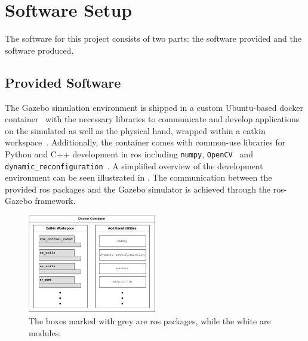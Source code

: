 \section{Software Setup}\label{sec:system-setup-software-setup}

The software for this project consists of two parts: the software provided and the software produced.

\subsection{Provided Software}\label{sec:system-setup-simulation-setup-provided}

The Gazebo simulation environment is shipped in a custom Ubuntu-based docker container~\cite{docker, ubuntu-docker-image} with the necessary libraries to communicate and develop applications on the simulated as well as the physical hand, wrapped within a catkin workspace~\cite{catkin}. Additionally, the container comes with common-use libraries for Python and C++ development in \gls{ros} including \texttt{numpy}\cite{numpy}, \texttt{OpenCV}~\cite{opencv} and \texttt{dynamic\_reconfiguration}~\cite{dynamic-reconfiguration}. A simplified overview of the development environment can be seen illustrated in . The communication between the provided \gls{ros} packages and the Gazebo simulator is achieved through the \gls{ros}-Gazebo framework. 

\begin{figure}[!h]
	\begin{small}
		\begin{center}
			\includegraphics[width=0.5\textwidth]{chapters/system-setup/fig/init-package-diagram.pdf}
		\end{center}
		\caption{The boxes marked with grey are \gls{ros} packages, while the white are modules.}
		\label{fig:package-diagram}
	\end{small}
\end{figure}

